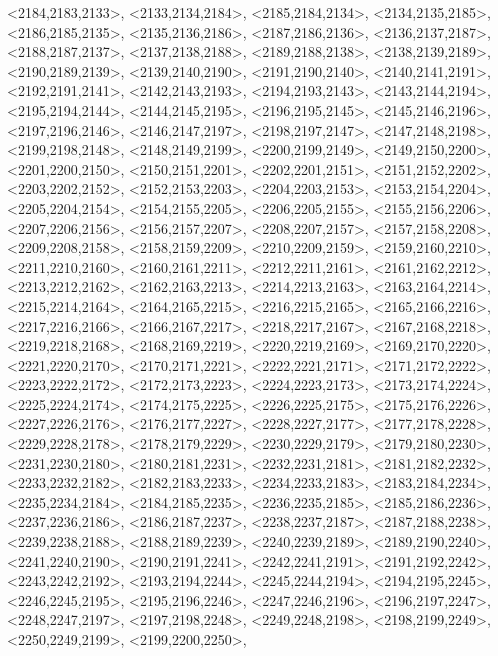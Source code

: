 \documentclass[a4paper,10pt]{article}
\begin{document}
\begin{eulernotebook}
\begin{euleroutput}
  <2184,2183,2133>,
  <2133,2134,2184>,
  <2185,2184,2134>,
  <2134,2135,2185>,
  <2186,2185,2135>,
  <2135,2136,2186>,
  <2187,2186,2136>,
  <2136,2137,2187>,
  <2188,2187,2137>,
  <2137,2138,2188>,
  <2189,2188,2138>,
  <2138,2139,2189>,
  <2190,2189,2139>,
  <2139,2140,2190>,
  <2191,2190,2140>,
  <2140,2141,2191>,
  <2192,2191,2141>,
  <2142,2143,2193>,
  <2194,2193,2143>,
  <2143,2144,2194>,
  <2195,2194,2144>,
  <2144,2145,2195>,
  <2196,2195,2145>,
  <2145,2146,2196>,
  <2197,2196,2146>,
  <2146,2147,2197>,
  <2198,2197,2147>,
  <2147,2148,2198>,
  <2199,2198,2148>,
  <2148,2149,2199>,
  <2200,2199,2149>,
  <2149,2150,2200>,
  <2201,2200,2150>,
  <2150,2151,2201>,
  <2202,2201,2151>,
  <2151,2152,2202>,
  <2203,2202,2152>,
  <2152,2153,2203>,
  <2204,2203,2153>,
  <2153,2154,2204>,
  <2205,2204,2154>,
  <2154,2155,2205>,
  <2206,2205,2155>,
  <2155,2156,2206>,
  <2207,2206,2156>,
  <2156,2157,2207>,
  <2208,2207,2157>,
  <2157,2158,2208>,
  <2209,2208,2158>,
  <2158,2159,2209>,
  <2210,2209,2159>,
  <2159,2160,2210>,
  <2211,2210,2160>,
  <2160,2161,2211>,
  <2212,2211,2161>,
  <2161,2162,2212>,
  <2213,2212,2162>,
  <2162,2163,2213>,
  <2214,2213,2163>,
  <2163,2164,2214>,
  <2215,2214,2164>,
  <2164,2165,2215>,
  <2216,2215,2165>,
  <2165,2166,2216>,
  <2217,2216,2166>,
  <2166,2167,2217>,
  <2218,2217,2167>,
  <2167,2168,2218>,
  <2219,2218,2168>,
  <2168,2169,2219>,
  <2220,2219,2169>,
  <2169,2170,2220>,
  <2221,2220,2170>,
  <2170,2171,2221>,
  <2222,2221,2171>,
  <2171,2172,2222>,
  <2223,2222,2172>,
  <2172,2173,2223>,
  <2224,2223,2173>,
  <2173,2174,2224>,
  <2225,2224,2174>,
  <2174,2175,2225>,
  <2226,2225,2175>,
  <2175,2176,2226>,
  <2227,2226,2176>,
  <2176,2177,2227>,
  <2228,2227,2177>,
  <2177,2178,2228>,
  <2229,2228,2178>,
  <2178,2179,2229>,
  <2230,2229,2179>,
  <2179,2180,2230>,
  <2231,2230,2180>,
  <2180,2181,2231>,
  <2232,2231,2181>,
  <2181,2182,2232>,
  <2233,2232,2182>,
  <2182,2183,2233>,
  <2234,2233,2183>,
  <2183,2184,2234>,
  <2235,2234,2184>,
  <2184,2185,2235>,
  <2236,2235,2185>,
  <2185,2186,2236>,
  <2237,2236,2186>,
  <2186,2187,2237>,
  <2238,2237,2187>,
  <2187,2188,2238>,
  <2239,2238,2188>,
  <2188,2189,2239>,
  <2240,2239,2189>,
  <2189,2190,2240>,
  <2241,2240,2190>,
  <2190,2191,2241>,
  <2242,2241,2191>,
  <2191,2192,2242>,
  <2243,2242,2192>,
  <2193,2194,2244>,
  <2245,2244,2194>,
  <2194,2195,2245>,
  <2246,2245,2195>,
  <2195,2196,2246>,
  <2247,2246,2196>,
  <2196,2197,2247>,
  <2248,2247,2197>,
  <2197,2198,2248>,
  <2249,2248,2198>,
  <2198,2199,2249>,
  <2250,2249,2199>,
  <2199,2200,2250>,

\end{euleroutput}
\end{eulernotebook}
\end{document}
